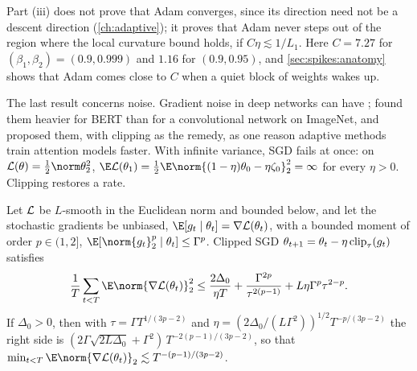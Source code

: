 \begin{refsection}
Part (iii) does not prove that Adam converges, since its direction need not be a descent direction (\cref{ch:adaptive}); it proves that Adam never steps out of the region where the local curvature bound holds, if $C\eta\lesssim1/L_1$. Here $C=7.27$ for $(\beta_1,\beta_2)=(0.9,0.999)$ and $1.16$ for $(0.9,0.95)$, and \cref{sec:spikes:anatomy} shows that Adam comes close to $C$ when a quiet block of weights wakes up.

The last result concerns noise. Gradient noise in deep networks can have  \parencite{SimsekliSagunGurbuzbalaban2019}; \textcite{ZhangEtAl2020Attention} found them heavier for BERT than for a convolutional network on ImageNet, and proposed them, with clipping as the remedy, as one reason adaptive methods train attention models faster. With infinite variance, SGD fails at once: on $\Loss(\theta)=\frac12\norm\theta_2^2$, $\E\Loss(\theta_1)=\frac12\E\norm{(1-\eta)\theta_0-\eta\zeta_0}_2^2=\infty$ for every $\eta>0$. Clipping restores a rate.

\begin{theorem}\label{thm:spikes:heavy}
Let $\mathcal{L}$ be $L$-smooth in the Euclidean norm and bounded below, and let the stochastic gradients be unbiased, $\E[g_t\mid\theta_t]=\nabla\Loss(\theta_t)$, with a bounded moment of order $p\in(1,2]$, $\E[\norm{g_t}_2^p\mid\theta_t]\le\Gamma^p$. Clipped SGD $\theta_{t+1}=\theta_t-\eta\operatorname{clip}_\tau(g_t)$ satisfies
\begin{equation}\label{eq:spikes:heavy}
  \frac1T\sum_{t<T}\E\norm{\nabla\Loss(\theta_t)}_2^2\le\frac{2\Delta_0}{\eta T}+\frac{\Gamma^{2p}}{\tau^{2(p-1)}}+L\eta\Gamma^p\tau^{2-p}.
\end{equation}
If $\Delta_0>0$, then with $\tau=\Gamma T^{1/(3p-2)}$ and $\eta=(2\Delta_0/(L\Gamma^2))^{1/2}T^{-p/(3p-2)}$ the right side is $(2\Gamma\sqrt{2L\Delta_0}+\Gamma^2)\,T^{-2(p-1)/(3p-2)}$, so that $\min_{t<T}\E\norm{\nabla\Loss(\theta_t)}_2\lesssim T^{-(p-1)/(3p-2)}$.
\end{theorem}


\end{refsection}

